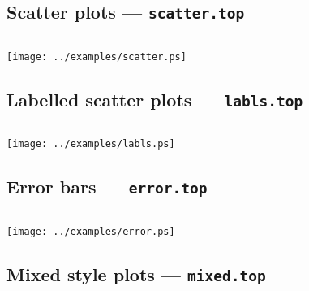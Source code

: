 
\def\scalea{0.7}
\def\scaleb{0.5}
\def\scalec{0.4}
\def\scaled{0.3}

\clearpage

\subsection{Scatter plots --- {\tt scatter.top}}

\vspace{1cm}

\begin{verbatim}

\end{verbatim}

\vspace{1cm}

\texttt{[image: ../examples/scatter.ps]}

\newpage

\subsection{Labelled scatter plots --- {\tt labls.top}}

\vspace{1cm}

\begin{verbatim}

\end{verbatim}

\vspace{1cm}

\texttt{[image: ../examples/labls.ps]}

\newpage

\subsection{Error bars --- {\tt error.top}}

\vspace{1cm}

\begin{verbatim}

\end{verbatim}

\vspace{1cm}
\texttt{[image: ../examples/error.ps]}

\newpage

\subsection{Mixed style plots --- {\tt mixed.top}}

